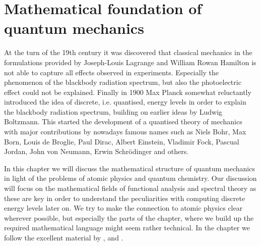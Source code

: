 \chapter{Mathematical foundation of quantum mechanics}


At the turn of the 19th century it was discovered
that classical mechanics in the formulations provided
by Joseph-Louis Lagrange and William Rowan Hamilton
is not able to capture all effects observed in experiments.
Especially the phenomenon of the blackbody radiation spectrum,
but also the photoelectric effect could not be explained.
Finally in 1900 Max Planck somewhat reluctantly introduced the idea of discrete,
i.e. quantised, energy levels
in order to explain the blackbody radiation spectrum,
building on earlier ideas by Ludwig Boltzmann.
This started the development of a quantised theory of mechanics
with major contributions by nowadays famous names such as
Niels Bohr, Max Born, Louis de Broglie, Paul Dirac, Albert Einstein,
Vladimir Fock, Pascual Jordan, John von Neumann, Erwin Schrödinger
and others.

In this chapter we will discuss the mathematical structure
of quantum mechanics in light of the problems of atomic physics
and quantum chemistry.
Our discussion will focus on the mathematical fields of functional
analysis and spectral theory as these are key in order
to understand the peculiarities with computing discrete
energy levels later on.
We try to make the connection to atomic physics clear wherever possible,
but especially the parts of the chapter,
where we build up the required mathematical language might seem
rather technical.
In the chapter we follow the excellent material by \citet{Shankar1994},
\citet{Mueller2000} and \citet{Helffer2013}.





